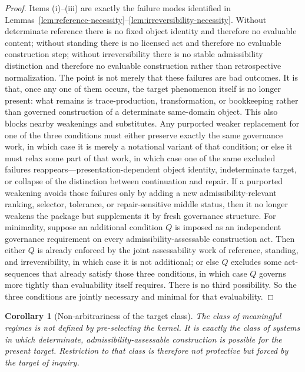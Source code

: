\documentclass[11pt]{article}
\newtheorem{corollary}[theorem]{Corollary}
\theoremstyle{definition}
\theoremstyle{remark}
\begin{document}
\begin{proof}
Items (i)--(iii) are exactly the failure modes identified in Lemmas~\ref{lem:reference-necessity}--\ref{lem:irreversibility-necessity}. Without determinate reference there is no fixed object identity and therefore no evaluable content; without standing there is no licensed act and therefore no evaluable construction step; without irreversibility there is no stable admissibility distinction and therefore no evaluable construction rather than retrospective normalization. The point is not merely that these failures are bad outcomes. It is that, once any one of them occurs, the target phenomenon itself is no longer present: what remains is trace-production, transformation, or bookkeeping rather than governed construction of a determinate same-domain object. This also blocks nearby weakenings and substitutes. Any purported weaker replacement for one of the three conditions must either preserve exactly the same governance work, in which case it is merely a notational variant of that condition; or else it must relax some part of that work, in which case one of the same excluded failures reappears---presentation-dependent object identity, indeterminate target, or collapse of the distinction between continuation and repair. If a purported weakening avoids those failures only by adding a new admissibility-relevant ranking, selector, tolerance, or repair-sensitive middle status, then it no longer weakens the package but supplements it by fresh governance structure. For minimality, suppose an additional condition $Q$ is imposed as an independent governance requirement on every admissibility-assessable construction act. Then either $Q$ is already enforced by the joint assessability work of reference, standing, and irreversibility, in which case it is not additional; or else $Q$ excludes some act-sequences that already satisfy those three conditions, in which case $Q$ governs more tightly than evaluability itself requires. There is no third possibility. So the three conditions are jointly necessary and minimal for that evaluability.
\end{proof}

\begin{corollary}[Non-arbitrariness of the target class]\label{cor:non-arbitrariness-target-class}
The class of meaningful regimes is not defined by pre-selecting the kernel. It is exactly the class of systems in which determinate, admissibility-assessable construction is possible for the present target. Restriction to that class is therefore not protective but forced by the target of inquiry.
\end{corollary}
\end{document}
